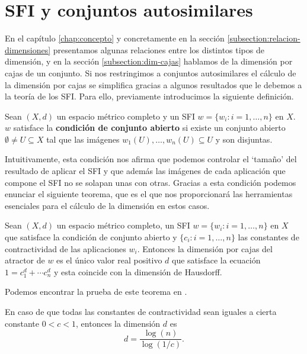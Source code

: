 \section{SFI y conjuntos autosimilares}
\label{section:sfi-conjuntos-autosimilares}

En el capítulo \ref{chap:concepto} y concretamente en la sección \ref{subsection:relacion-dimensiones} presentamos algunas relaciones entre los distintos tipos de dimensión, y en la sección \ref{subsection:dim-cajas} hablamos de la dimensión por cajas de un conjunto. Si nos restringimos a conjuntos autosimilares el cálculo de la dimensión por cajas se simplifica gracias a algunos resultados que le debemos a la teoría de los SFI. Para ello, previamente introducimos la siguiente definición.

\begin{definicion}
    \label{def:condicion-conjunto-abierto}
    Sean $(X,d)$ un espacio métrico completo y un SFI $w=\{w_i:i=1,\dots,n\}$ en $X$. $w$ satisface la \textbf{condición de conjunto abierto} si existe un conjunto abierto $\emptyset\not= U\subseteq X$ tal que las imágenes $w_1(U),\dots,w_n(U)\subseteq U$ y son disjuntas.
\end{definicion}

Intuitivamente, esta condición nos afirma que podemos controlar el `tamaño' del resultado de aplicar el SFI y que además las imágenes de cada aplicación que compone el SFI no se solapan unas con otras. Gracias a esta condición podemos enunciar el siguiente teorema, que es el que nos proporcionará las herramientas esenciales para el cálculo de la dimensión en estos casos.

\begin{teorema}[Moran]
    \label{th:Moran}
    Sean $(X,d)$ un espacio métrico completo, un SFI $w=\{w_i:i=1,\dots,n\}$ en $X$ que satisface la condición de conjunto abierto y $\{c_i:i=1,\dots,n\}$ las constantes de contractividad de las aplicaciones $w_i$. Entonces la dimensión por cajas del atractor de $w$ es el único valor real positivo $d$ que satisface la ecuación $1 = c_1^d + \cdots c_n^d$ y esta coincide con la dimensión de Hausdorff.
\end{teorema}

Podemos encontrar la prueba de este teorema en \cite{Moran}.

\begin{corolario}
    En caso de que todas las constantes de contractividad sean iguales a cierta constante $0<c<1$, entonces la dimensión $d$ es
    $$
    d = \dfrac{\log(n)}{\log(1/c)}.
    $$
\end{corolario}

